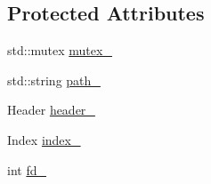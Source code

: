 \subsection*{Protected Attributes}
\begin{DoxyCompactItemize}
\item 
std\-::mutex \hyperlink{classapollo_1_1cyber_1_1record_1_1RecordFileBase_a3dc8cd39b2ed0e2f28490f80923f4582}{mutex\-\_\-}
\item 
std\-::string \hyperlink{classapollo_1_1cyber_1_1record_1_1RecordFileBase_a2c1132e34b786a471501e3a43f7be672}{path\-\_\-}
\item 
Header \hyperlink{classapollo_1_1cyber_1_1record_1_1RecordFileBase_af6940c8d8e756da009bee5e0188da259}{header\-\_\-}
\item 
Index \hyperlink{classapollo_1_1cyber_1_1record_1_1RecordFileBase_a6af38cb5f916cf9ba1d8477edc0afeb9}{index\-\_\-}
\item 
int \hyperlink{classapollo_1_1cyber_1_1record_1_1RecordFileBase_aaa370e96b2b0fde778dc514652a0a912}{fd\-\_\-}
\end{DoxyCompactItemize}


